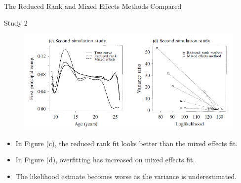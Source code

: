 \documentclass{beamer}
\begin{document}
\begin{frame}{The Reduced Rank and Mixed Effects Methods Compared}
	\begin{block}{Study 2}
		\begin{figure}[h] %
			\begin{center}
				\includegraphics[width=0.7\linewidth]{img/6.png}
			\end{center}
			\label{fig:long}
			\label{fig:onecol}
		\end{figure}
		\begin{itemize}
			\item {
				In Figure (c), the reduced rank fit looks better than the mixed effects fit.
			}
			\item {
				In Figure (d), overfitting has increased on mixed effects fit.
			}
			\item {
				The likelihood estmate becomes worse as the variance is underestimated.
			}
		\end{itemize}
	\end{block}
\end{frame}
\end{document}
